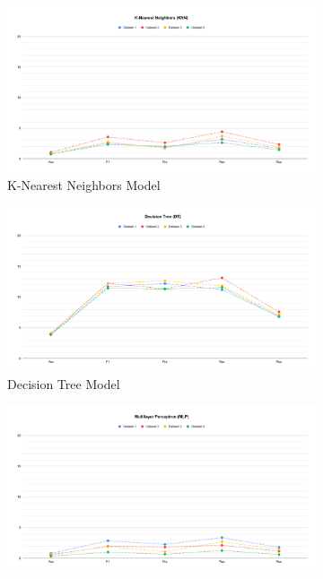 \documentclass[a4paper,fleqn]{cas-dc}
\begin{document}
\begin{figure}[H]
    \begin{subfigure}{\columnwidth}
        \includegraphics[width=0.9\columnwidth]{delta_KNN.pdf}
        \caption{K-Nearest Neighbors Model}\label{fig:performance_delta_knn}
    \end{subfigure}
    \begin{subfigure}{\columnwidth}
        \includegraphics[width=0.9\columnwidth]{delta_DT.pdf}
        \caption{Decision Tree Model}\label{fig:performance_delta_dt}
    \end{subfigure}
    \begin{subfigure}{\columnwidth}
        \includegraphics[width=0.9\columnwidth]{delta_MLP.pdf}

\end{subfigure}
\end{figure}
\end{document}

